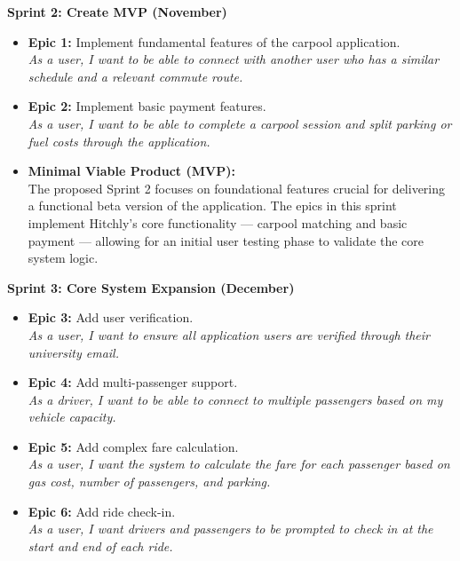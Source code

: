 \documentclass[12pt,letterpaper]{article}
\begin{document}
\textbf{Sprint 2: Create MVP (November)}
\begin{itemize}
    \item \textbf{Epic 1:} Implement fundamental features of the carpool application. \\
    \textit{As a user, I want to be able to connect with another user who has a similar schedule and a relevant commute route.}
    
    \item \textbf{Epic 2:} Implement basic payment features. \\
    \textit{As a user, I want to be able to complete a carpool session and split parking or fuel costs through the application.}
    
    \item \textbf{Minimal Viable Product (MVP):} \\
    The proposed Sprint 2 focuses on foundational features crucial for delivering a functional beta version of the application. The epics in this sprint implement Hitchly’s core functionality — carpool matching and basic payment — allowing for an initial user testing phase to validate the core system logic.
\end{itemize}

\textbf{Sprint 3: Core System Expansion (December)}
\begin{itemize}
    \item \textbf{Epic 3:} Add user verification. \\
    \textit{As a user, I want to ensure all application users are verified through their university email.}

    \item \textbf{Epic 4:} Add multi-passenger support. \\
    \textit{As a driver, I want to be able to connect to multiple passengers based on my vehicle capacity.}

    \item \textbf{Epic 5:} Add complex fare calculation. \\
    \textit{As a user, I want the system to calculate the fare for each passenger based on gas cost, number of passengers, and parking.}

    \item \textbf{Epic 6:} Add ride check-in. \\
    \textit{As a user, I want drivers and passengers to be prompted to check in at the start and end of each ride.}
\end{itemize}
\end{document}
